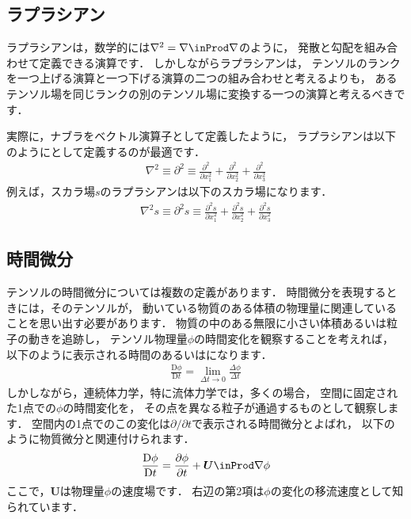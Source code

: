 \subsection{ラプラシアン}
\label{ssec:2.1.4}
ラプラシアンは，数学的には$\nabla^{2} = \nabla \inProd \nabla$のように，
発散と勾配を組み合わせて定義できる演算です．
しかしながらラプラシアンは，
テンソルのランクを一つ上げる演算と一つ下げる演算の二つの組み合わせと考えるよりも，
あるテンソル場を同じランクの別のテンソル場に変換する一つの演算と考えるべきです．

実際に，ナブラをベクトル演算子として定義したように，
ラプラシアンは以下のようにとして定義するのが最適です．
\begin{align}
 \label{eq:2.8}
 \nabla^{2} \equiv \partial^{2} \equiv
 \frac{\partial^{2}}{\partial x_{1}^{2}}
 + \frac{\partial^{2}}{\partial x_{2}^{2}}
 + \frac{\partial^{2}}{\partial x_{3}^{2}}
\end{align}
例えば，スカラ場$s$のラプラシアンは以下のスカラ場になります．
\begin{align}
 \label{eq:2.9}
 \nabla^{2}s \equiv \partial^{2}s \equiv
 \frac{\partial^{2}s}{\partial x_{1}^{2}}
 + \frac{\partial^{2}s}{\partial x_{2}^{2}}
 + \frac{\partial^{2}s}{\partial x_{3}^{2}}
\end{align}


\subsection{時間微分}
\label{ssec:2.1.5}
テンソルの時間微分については複数の定義があります．
時間微分を表現するときには，そのテンソルが，
動いている物質のある体積の物理量に関連していることを思い出す必要があります．
物質の中のある無限に小さい体積あるいは粒子の動きを追跡し，
テンソル物理量$\phi$の時間変化を観察することを考えれば，
以下のように表示される時間のあるいはになります．
\begin{align}
 \label{eq:2.10}
 \frac{\mathrm{D}\phi}{\mathrm{D}t} = \lim_{\Delta t \to 0}\frac{\Delta\phi}{\Delta t}
\end{align}
しかしながら，連続体力学，特に流体力学では，多くの場合，
空間に固定された1点での$\phi$の時間変化を，
その点を異なる粒子が通過するものとして観察します．
空間内の1点でのこの変化は$\partial / \partial t$で表示される時間微分とよばれ，
以下のように物質微分と関連付けられます．
\begin{align}
 \label{eq:2.11}
 \frac{\mathrm{D}\phi}{\mathrm{D}t}
 = \frac{\partial\phi}{\partial t} + \bm{U} \inProd \nabla\phi
\end{align}
ここで，$\bm{U}$は物理量$\phi$の速度場です．
右辺の第2項は$\phi$の変化の移流速度として知られています．



